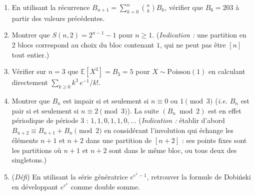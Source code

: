 \begin{mdframed}[style=exobar]
  \begin{enumerate}
    \item En utilisant la récurrence $B_{n+1} = \sum_{k=0}^{n}\binom{n}{k}B_k$,
          vérifier que $B_6 = 203$ à partir des valeurs précédentes.

    \item Montrer que $S(n,2) = 2^{n-1}-1$ pour $n\geq 1$.
          (\textit{Indication :} une partition en 2 blocs correspond au choix du
          bloc contenant $1$, qui ne peut pas être $[n]$ tout entier.)

    \item Vérifier sur $n=3$ que $\mathbb{E}[X^3] = B_3 = 5$ pour
          $X\sim\mathrm{Poisson}(1)$ en calculant directement
          $\sum_{k\geq 0} k^3\,e^{-1}/k!$.

    \item Montrer que $B_n$ est impair si et seulement si $n\equiv 0$ ou
          $1\pmod{3}$ (\textit{i.e.} $B_n$ est pair si et seulement si
          $n\equiv 2\pmod{3}$). La suite $(B_n \bmod 2)$ est en effet
          périodique de période $3$ : $1,1,0,1,1,0,\ldots$
          (\textit{Indication :} établir d'abord
          $B_{n+2} \equiv B_{n+1} + B_n \pmod{2}$ en considérant l'involution
          qui échange les éléments $n+1$ et $n+2$ dans une partition de
          $[n+2]$ : ses points fixes sont les partitions où $n+1$ et $n+2$
          sont dans le même bloc, ou tous deux des singletons.)

    \item (\textit{Défi}) En utilisant la série génératrice $e^{e^x-1}$,
          retrouver la formule de Dobi\'nski en développant $e^{e^x}$ comme
          double somme.
  \end{enumerate}
\end{mdframed}

